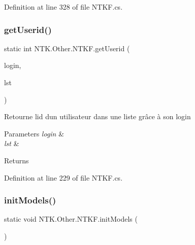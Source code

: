 Definition at line 328 of file N\+T\+K\+F.\+cs.

\mbox{\label{class_n_t_k_1_1_other_1_1_n_t_k_f_ae002d6557a7065f774ca9893ca0617e5}} 
\subsubsection{\texorpdfstring{getUserid()}{getUserid()}}
{\footnotesize\ttfamily static int N\+T\+K.\+Other.\+N\+T\+K\+F.\+get\+Userid (\begin{DoxyParamCaption}\item[{String}]{login,  }\item[{List$<$ \mbox{\hyperlink{class_n_t_k_1_1_n_t_k_user}{N\+T\+K\+User}} $>$}]{lst }\end{DoxyParamCaption})\hspace{0.3cm}{\ttfamily [static]}}



Retourne l\textquotesingle{}id d\textquotesingle{}un utilisateur dans une liste grâce à son login 


\begin{DoxyParams}{Parameters}
{\em login} & \\
\hline
{\em lst} & \\
\hline
\end{DoxyParams}
\begin{DoxyReturn}{Returns}

\end{DoxyReturn}


Definition at line 229 of file N\+T\+K\+F.\+cs.

\mbox{\label{class_n_t_k_1_1_other_1_1_n_t_k_f_a893317d7db3f972ce52bfc1c947116b1}} 
\subsubsection{\texorpdfstring{initModels()}{initModels()}}
{\footnotesize\ttfamily static void N\+T\+K.\+Other.\+N\+T\+K\+F.\+init\+Models (\begin{DoxyParamCaption}{ }\end{DoxyParamCaption})\hspace{0.3cm}{\ttfamily [static]}}



